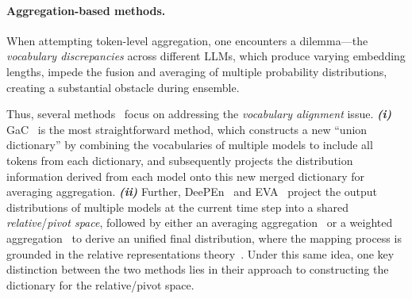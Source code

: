 \documentclass{article}
\begin{document}
\paragraph{Aggregation-based methods.}
When attempting token-level aggregation, one encounters a dilemma---the \textit{vocabulary discrepancies} across different LLMs, which produce varying embedding lengths, impede the fusion and averaging of multiple probability distributions, creating a substantial obstacle during ensemble.


Thus, several methods~\cite{yu2024breaking,huang2024ensemble,xu2024bridging} focus on addressing the \textit{vocabulary alignment} issue.
\textbf{\textit{(i)}}
GaC~\cite{yu2024breaking} is the most straightforward method, which constructs a new   ``union dictionary'' by combining the vocabularies of multiple models to include all tokens from each dictionary, and subsequently projects the distribution information derived from each model onto this new merged dictionary for averaging aggregation.
\textbf{\textit{(ii)}}
Further, DeePEn~\cite{huang2024ensemble} and EVA~\cite{xu2024bridging} project the output distributions of multiple models at the current time step into a shared \textit{relative}/\textit{pivot space}, followed by either an averaging aggregation~\cite{huang2024ensemble} or a weighted aggregation~\cite{huang2024ensemble,xu2024bridging} to derive an unified final distribution, where the mapping process is grounded in the relative representations theory~\cite{moschella2022relative}.
Under this same idea, one key distinction between the two methods lies in their approach to constructing the dictionary for the relative/pivot space.
\end{document}
